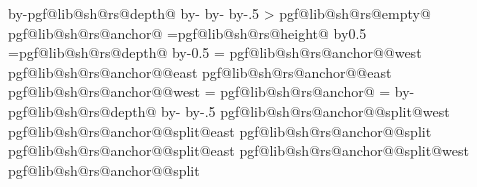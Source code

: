 {{{				\advance\pgf@y by-\csname pgf@lib@sh@rs@depth@\pgf@lib@sh@rs@lastnumber\endcsname\relax%
				\advance\pgf@y by-\innerysep\relax%
				\advance\pgf@y by-\outerysep\relax%
				\advance\pgf@y by-.5\pgflinewidth%
			}%
			\addtosavedmacro\southwest%
			\pgfextract@process{}%
			\addtosavedmacro\centerpoint%
			\pgfmathloop%
				\ifnum\pgfmathcounter>\parts%
				\else%
					\pgf@lib@sh@getalpha\pgf@lib@sh@rs@number{\pgfmathcounter}%
					\expandafter\ifx\csname pgf@lib@sh@rs@empty@\pgf@lib@sh@rs@number\endcsname\pgfutil@empty%
					\else%
						\csname pgf@lib@sh@rs@anchor@\pgf@lib@sh@rs@number\endcsname%
						\pgf@ya=\csname pgf@lib@sh@rs@height@\pgf@lib@sh@rs@number\endcsname\relax%
						\advance\pgf@y by0.5\pgf@ya%
						\pgf@ya=\csname pgf@lib@sh@rs@depth@\pgf@lib@sh@rs@number\endcsname\relax%
						\advance\pgf@y by-0.5\pgf@ya%
						\pgf@ya=\pgf@y%
						\expandafter\pgfextract@process\csname pgf@lib@sh@rs@anchor@\pgf@lib@sh@rs@number @west\endcsname{%
							\southwest%
							\pgf@y=\pgf@ya%
						}%
						\expandafter\pgfextract@process\csname pgf@lib@sh@rs@anchor@\pgf@lib@sh@rs@number @east\endcsname{%
							\northeast%
							\pgf@y=\pgf@ya%
						}%
						\expandafter\addtosavedmacro\csname pgf@lib@sh@rs@anchor@\pgf@lib@sh@rs@number @east\endcsname%
						\expandafter\addtosavedmacro\csname pgf@lib@sh@rs@anchor@\pgf@lib@sh@rs@number @west\endcsname%
						\ifnum\pgfmathcounter=\parts%
						\else%
							\csname pgf@lib@sh@rs@anchor@\pgf@lib@sh@rs@number\endcsname%
							\pgf@ya=\pgf@y%
							\advance\pgf@ya by-\csname pgf@lib@sh@rs@depth@\pgf@lib@sh@rs@number\endcsname\relax%
							\advance\pgf@ya by-\innerysep\relax%
							\advance\pgf@ya by-.5\pgflinewidth%
							\expandafter\pgfextract@process\csname pgf@lib@sh@rs@anchor@\pgf@lib@sh@rs@number @split@west\endcsname{%
								\southwest%
								\pgf@y=\pgf@ya%
							}%
							\expandafter\pgfextract@process\csname pgf@lib@sh@rs@anchor@\pgf@lib@sh@rs@number @split@east\endcsname{%
								\northeast%
								\pgf@y=\pgf@ya%
							}%
							\expandafter\pgfextract@process\csname pgf@lib@sh@rs@anchor@\pgf@lib@sh@rs@number @split\endcsname{%
								\centerpoint%
								\pgf@y=\pgf@ya%
							}%
							\expandafter\addtosavedmacro\csname pgf@lib@sh@rs@anchor@\pgf@lib@sh@rs@number @split@east\endcsname%
							\expandafter\addtosavedmacro\csname pgf@lib@sh@rs@anchor@\pgf@lib@sh@rs@number @split@west\endcsname%
							\expandafter\addtosavedmacro\csname pgf@lib@sh@rs@anchor@\pgf@lib@sh@rs@number @split\endcsname%
}}
